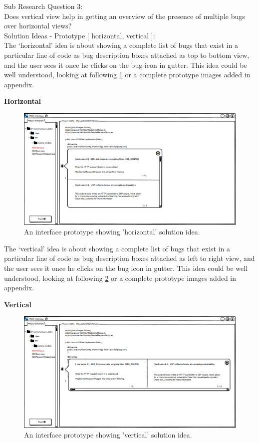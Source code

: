 Sub Research Question 3: \\

Does vertical view help in getting an overview of the presence of multiple bugs over horizontal views? \\

Solution Ideas - Prototype [ horizontal, vertical ]: \\

The ‘horizontal’ idea is about showing a complete list of bugs that exist in a particular line of code as bug description boxes attached as top to bottom view, and the user sees it once he clicks on the bug icon in gutter. This idea could be well understood, looking at following \ref{fig:S31_horizontal} or a complete prototype images added in appendix.

\textbf{Horizontal}
\begin{figure}[hbt!]
	\centering
	\includegraphics[width=\linewidth]{figures/solution_ideas_snaps/S31_horizontal}
	\caption{An interface prototype showing 'horizontal' solution idea.}
	\label{fig:S31_horizontal}
\end{figure} 

The ‘vertical’ idea is about showing a complete list of bugs that exist in a particular line of code as bug description boxes attached as left to right view, and the user sees it once he clicks on the bug icon in gutter. This idea could be well understood, looking at following \ref{fig:S31_vertical} or a complete prototype images added in appendix.

\textbf{Vertical}
\begin{figure}[hbt!]
	\centering
	\includegraphics[width=\linewidth]{figures/solution_ideas_snaps/S31_vertical}
	\caption{An interface prototype showing 'vertical' solution idea.}
	\label{fig:S31_vertical}
\end{figure} 

